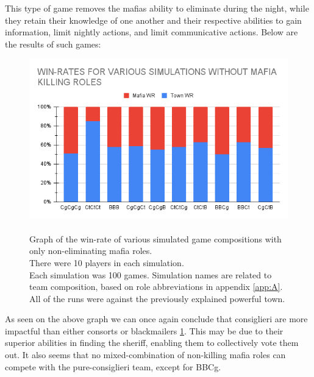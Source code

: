 This type of game removes the mafias ability to eliminate during the night, while
they retain their knowledge of one another and their respective abilities to
gain information, limit nightly actions, and limit communicative actions. Below
are the results of such games:
\begin{figure}[H]
    \includegraphics[width=1\linewidth]{figures/Winrates_NonKilling}
    \caption{\\Graph of the win-rate of various simulated game compositions
        with only non-eliminating mafia roles.\\
        There were 10 players in each simulation.\\
        Each simulation was 100 games.
        Simulation names are related to team composition, based on role
        abbreviations in appendix \ref{app:A}.\\
        All of the runs were against the previously explained powerful town.}
    \label{fig:VariousSimulationsNonKilling}
\end{figure}
\vspace{-5px} As seen on the above graph we can once again conclude that
consiglieri are more impactful than either consorts or blackmailers \ref{fig:VariousSimulationsNonKilling}. This may
be due to their superior abilities in finding the sheriff, enabling them to
collectively vote them out. It also seems that no mixed-combination of
non-killing mafia roles can compete with the pure-consiglieri team, except for BBCg.
